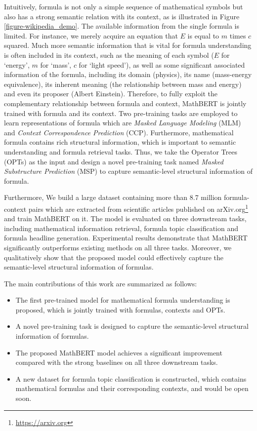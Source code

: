 \documentclass{article}
\begin{document}
Intuitively, formula is not only a simple sequence of mathematical symbols but also has a strong semantic relation with its context, as is illustrated in Figure \ref{figure-wikipedia_demo}. The available information from the single formula is limited. For instance, we merely acquire an equation that $E$ is equal to $m$ times $c$ squared. Much more semantic information that is vital for formula understanding is often included in its context, such as the meaning of each symbol ($E$ for ‘energy’, $m$ for ‘mass’, $c$ for ‘light speed’), as well as some significant associated information of the formula, including its domain (physics), its name (mass-energy equivalence), its inherent meaning (the relationship between mass and energy) and even its proposer (Albert Einstein). Therefore, to fully exploit the complementary relationship between formula and context, MathBERT is jointly trained with formula and its context. Two pre-training tasks are employed to learn representations of formula which are \textit{Masked Language Modeling} (MLM) and \textit{Context Correspondence Prediction} (CCP). Furthermore, mathematical formula contains rich structural information, which is important to semantic understanding and formula retrieval tasks. Thus, we take the Operator Trees (OPTs) as the input and design a novel pre-training task named \textit{Masked Substructure Prediction} (MSP) to capture semantic-level structural information of formula. 

Furthermore, We build a large dataset containing more than 8.7 million formula-context pairs which are extracted from scientific articles published on arXiv.org\footnote{\url{https://arxiv.org}} and train MathBERT on it. The model is evaluated on three downstream tasks, including mathematical information retrieval, formula topic classification and formula headline generation. Experimental results demonstrate that MathBERT significantly outperforms existing methods on all three tasks. Moreover, we qualitatively show that the proposed model could effectively capture the semantic-level structural information of formulas. 

The main contributions of this work are summarized as follows:
\begin{itemize}
    \item The first pre-trained model for mathematical formula understanding is proposed, which is jointly trained with formulas, contexts and OPTs.
    \item A novel pre-training task is designed to capture the semantic-level structural information of formulas.
    \item The proposed MathBERT model achieves a significant improvement compared with the strong baselines on all three downstream tasks.
    \item A new dataset for formula topic classification is constructed, which contains mathematical formulas and their corresponding contexts, and would be open soon.
\end{itemize}
\end{document}
